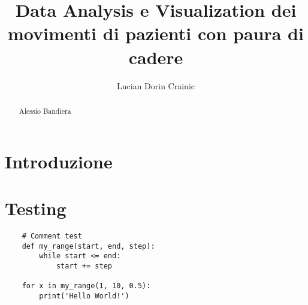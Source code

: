 \documentclass[binding=0.6cm]{sapthesis}
\title{Data Analysis e Visualization dei movimenti di pazienti con paura di cadere}
\author{Lucian Dorin Crainic}
\begin{document}
\lstset{language=Python}

\frontmatter
\maketitle

\dedication{A chi mi ha sopportato per tutti questi anni}

\begin{abstract}
Alessio Bandiera
\end{abstract}
\tableofcontents
\mainmatter
\chapter{Introduzione}

\chapter{Testing}

\begin{lstlisting}
    # Comment test
    def my_range(start, end, step):
        while start <= end:
            start += step

    for x in my_range(1, 10, 0.5):
        print('Hello World!')
\end{lstlisting}

\backmatter
{}



\end{document}
